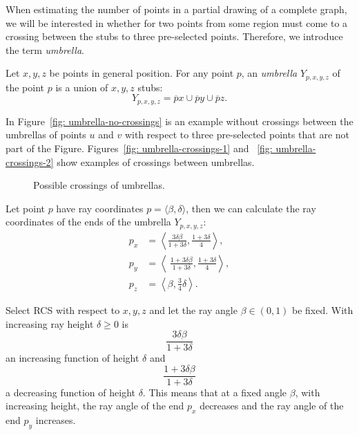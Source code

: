When estimating the number of points in a partial drawing of a complete graph, we will be interested in whether for two points from some region must come to a crossing between the stubs to three pre-selected points. Therefore, we introduce the term {\it umbrella}.

\begin{definition}[Umbrella]
Let $x, y, z$ be points in general position. For any point $p$, an \textit{umbrella} $Y_{p,x,y,z}$ of the point $p$ is a union of $x, y, z$ stubs:
\begin{equation*}
Y_{p,x,y,z} = \overline{p}x \cup \overline{p}y \cup \overline{p}z.
\end{equation*}
\label{umbrella}
\end{definition}

In Figure~\ref{fig: umbrella-no-crossings} is an example without crossings between the umbrellas of points $u$ and $v$ with respect to three pre-selected points that are not part of the Figure. Figures~\ref{fig: umbrella-crossings-1} and ~\ref{fig: umbrella-crossings-2} show examples of crossings between umbrellas.

\begin{figure}
\centering

\caption{Possible crossings of umbrellas.}
\label{fig: umbrella-crossings}
\end{figure}

Let point $p$ have ray coordinates $p = \langle\beta, \delta\rangle$, then we can calculate the ray coordinates of the ends of the umbrella $Y_{p,x,y,z}$:
\begin{align}
  \label{eq: ray-coordinates-umbrella-1}
  p_{x} &= \left\langle \frac{3\delta\beta}{1+3\delta}, \frac{1+3\delta}{4} \right\rangle,\\[6pt]
  \label{eq: ray-coordinates-umbrella-2}
  p_{y} &= \left\langle\ \frac{1+3\delta\beta}{1+3\delta}, \frac{1+3\delta}{4} \right\rangle,\\[6pt]
  p_{z} &= \left\langle \beta, \frac{3}{4}\delta \right\rangle.
\end{align}


\begin{corollary}
\label{cor: consequence-of-ray-coordinates-of-umbrella-ends}
Select RCS with respect to $x,y,z$ and let the ray angle $\beta \in (0,1)$ be fixed. With increasing ray height $\delta \geq 0$ is
$$
\frac{3\delta\beta}{1+3\delta}
$$
an increasing function of height $\delta$ and
$$
\frac{1+3\delta\beta}{1+3\delta}
$$
a decreasing function of height $\delta$. This means that at a fixed angle $\beta$, with increasing height, the ray angle of the end $p_{x}$ decreases and the ray angle of the end $p_{y}$ increases.
\end{corollary}

